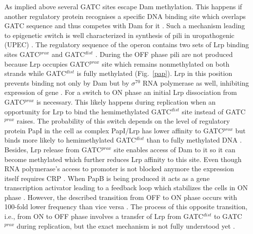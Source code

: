As implied above several GATC sites escape Dam methylation.
This happens if another regulatory protein recognises a specific DNA binding site which overlaps GATC sequence and thus competes with Dam for it \cite{correnti2002dam}.
Such a mechanism leading to epigenetic switch is well characterized in synthesis of  pili in uropathogenic  (UPEC) \cite{peterson2008competitive}.
The regulatory sequence of the  operon contains two sets of Lrp binding sites GATC$^{prox}$ and GATC$^{dist}$ \cite{blyn1990regulation}.
During the OFF phase  pili are not produced because Lrp occupies GATC$^{prox}$ site which remains nonmethylated on both strands while GATC$^{dist}$ is fully methylated (Fig.~\ref{pap}).
Lrp in this position prevents binding not only by Dam but by $\sigma^{70}$ RNA polymerase as well, inhibiting expression of  gene \cite{weyand2000regulation}.
For a switch to ON phase an initial Lrp dissociation from GATC$^{prox}$ is necessary.
This likely happens during replication when an opportunity for Lrp to bind the hemimethylated GATC$^{dist}$ site instead of GATC$^{prox}$ raises.
The probability of this switch depends on the level of regulatory protein PapI in the cell as complex PapI/Lrp has lower affinity to GATC$^{prox}$ but binds more likely to hemimethylated GATC$^{dist}$ than to fully methylated DNA \cite{hernday2003mechanism}.
Besides, Lrp release from GATC$^{prox}$ site enables access of Dam to it so it can become methylated which further reduces Lrp affinity to this site.
Even though RNA polymerase's access to  promoter is not blocked anymore the expression itself requires CRP \cite{weyand2001essential}.
When PapB is being produced it acts as a  gene transcription activator leading to a feedback loop which stabilizes the cells in ON phase \cite{forsman1989autoregulation}.
However, the described transition from OFF to ON phase occurs with 100-fold lower frequency than vice versa \cite{blyn1990regulation}.
The process of this opposite transition, i.e., from ON to OFF phase involves a transfer of Lrp from GATC$^{dist}$ to GATC$^{prox}$ during replication, but the exact mechanism is not fully understood yet \cite{adhikari2016dna}.

